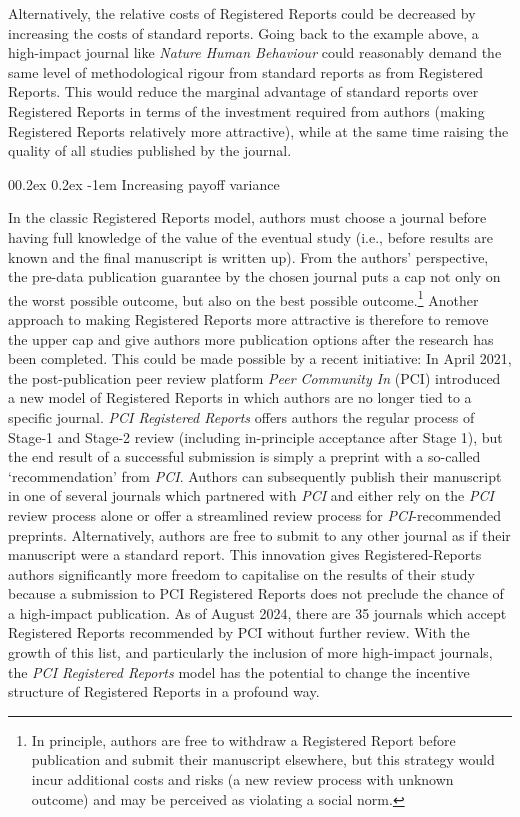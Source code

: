 \documentclass[
  british,
  a4paper,
  ,man,mask,floatsintext]{apa6}
\makeatletter
\let\oldparagraph\paragraph
\renewcommand{\paragraph}{
    \@ifstar
      \xxxParagraphStar
      \xxxParagraphNoStar
  }
\newcommand{\xxxParagraphStar}[1]{\oldparagraph*{#1}\mbox{}}
\newcommand{\xxxParagraphNoStar}[1]{\oldparagraph{#1}\mbox{}}
\renewcommand{\paragraph}{\@startsection{paragraph}{4}{\parindent}%
  {0\baselineskip \@plus 0.2ex \@minus 0.2ex}%
  {-1em}%
  {\normalfont\normalsize\bfseries\itshape\typesectitle}}
\makeatother
\begin{document}
Alternatively, the relative costs of Registered Reports could be decreased by increasing the costs of standard reports.
Going back to the example above, a high-impact journal like \emph{Nature Human Behaviour} could reasonably demand the same level of methodological rigour
from standard reports as from Registered Reports.
This
would reduce the marginal advantage of standard reports over Registered Reports in terms of the investment required from authors (making Registered Reports relatively more attractive), while at the same time raising the quality of all studies published by the journal.

\par\vspace{0.4\baselineskip}

\paragraph{Increasing payoff variance}\label{increasing-payoff-variance}

In the classic Registered Reports model, authors must choose a journal before having full knowledge of the value of the eventual study (i.e., before results are known and the final manuscript is written up).
From the authors' perspective, the pre-data publication guarantee by the chosen journal puts a cap not only on the worst possible outcome, but also on the best possible outcome.\footnote{In principle, authors are free to withdraw a Registered Report before publication and submit their manuscript elsewhere, but this strategy would incur additional costs and risks (a new review process with unknown outcome) and may be perceived as violating a social norm.}
Another approach to making Registered Reports more attractive is therefore to remove the upper cap and give authors more publication options after the research has been completed.
This could be made possible by a recent initiative:
In April 2021, the post-publication peer review platform \emph{Peer Community In} (PCI) introduced a new model of Registered Reports in which authors are no longer tied to a specific journal.
\emph{PCI Registered Reports} offers authors the regular process of Stage-1 and Stage-2 review (including in-principle acceptance after Stage 1), but the end result of a successful submission is simply a preprint with a so-called `recommendation' from \emph{PCI}.
Authors can subsequently publish their manuscript in one of several journals which partnered with \emph{PCI} and either rely on the \emph{PCI} review process alone or offer a streamlined review process for \emph{PCI}-recommended preprints.
Alternatively, authors are free to submit to any other journal as if their manuscript were a standard report.
This innovation gives Registered-Reports authors significantly more freedom to capitalise on the results of their study because a submission to PCI Registered Reports does not preclude the chance of a high-impact publication.
As of August 2024, there are 35 journals which accept Registered Reports recommended by PCI without further review.
With the growth of this list, and particularly the inclusion of more high-impact journals, the \emph{PCI Registered Reports} model has the potential to change the incentive structure of Registered Reports in a profound way.
\end{document}
